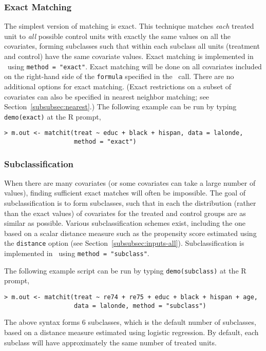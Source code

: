 \subsubsection{Exact Matching}
\label{subsubsec:exact}

The simplest version of matching is exact.  This technique matches
\emph{each} treated unit to \emph{all} possible control units with
exactly the same values on all the covariates, forming subclasses such
that within each subclass all units (treatment and control) have the
same covariate values.  Exact matching is implemented in \MatchIt\ 
using \texttt{method = "exact"}.  Exact matching will be done on all
covariates included on the right-hand side of the \texttt{formula}
specified in the \MatchIt\ call.  There are no additional options for
exact matching.  (Exact restrictions on a subset of covariates can
also be specified in nearest neighbor matching; see
Section~\ref{subsubsec:nearest}.)  The following example can be
run by typing {\tt demo(exact)} at the R prompt,
\begin{verbatim}
> m.out <- matchit(treat ~ educ + black + hispan, data = lalonde, 
                   method = "exact")
\end{verbatim}

\subsubsection{Subclassification}
\label{subsubsec:subclass}

When there are many covariates (or some covariates can take a large
number of values), finding sufficient exact matches will often be
impossible.  The goal of subclassification is to form subclasses, such
that in each the distribution (rather than the exact values) of
covariates for the treated and control groups are as similar as
possible.  Various subclassification schemes exist, including the one
based on a scalar distance measure such as the propensity score
estimated using the \texttt{distance} option (see
Section~\ref{subsubsec:inputs-all}).  Subclassification is implemented
in \MatchIt\ using \texttt{method = "subclass"}.

The following example script can be run by typing {\tt demo(subclass)}
at the R prompt,
\begin{verbatim}
> m.out <- matchit(treat ~ re74 + re75 + educ + black + hispan + age, 
                   data = lalonde, method = "subclass")
\end{verbatim}
The above syntax forms 6 subclasses, which is the default number
of subclasses, based on a distance measure estimated using logistic
regression.  By default, each subclass will have approximately the
same number of treated units.

